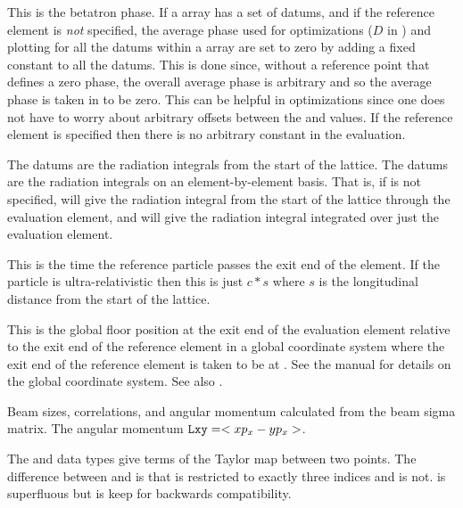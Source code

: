 \begin{description}
{  
  \item[phase.] \Newline
This is the betatron phase.  If a  array has a set of
 datums, and if the reference element is {\em not}
specified, the average phase used for optimizations ($D$ in
) and plotting for all the datums within a 
array are set to zero by adding a fixed constant to all the datums.
This is done since, without a reference point that defines a zero
phase, the overall average phase is arbitrary and so the average phase
is taken in \tao to be zero. This can be helpful in optimizations
since one does not have to worry about arbitrary offsets between the
 and  values. If the reference element is
specified then there is no arbitrary constant in the evaluation.

  \item[rad_int, rad_int1] \Newline
The  datums are the radiation integrals from the start of
the lattice. The  datums are the radiation integrals on
an element-by-element basis. That is, if  is not specified,
 will give the radiation integral from the start of the 
lattice through the evaluation element, and  will give
the radiation integral integrated over just the evaluation element.

  \item[ref_time] \Newline
This is the time the reference particle passes the exit end of the element.
If the particle is ultra-relativistic then this is just $c * s$ where $s$
is the longitudinal distance from the start of the lattice.

  \item[rel\_floor.] \Newline
This is the global floor position at the exit end of the evaluation
element relative to the exit end of the reference element in a global
coordinate system where the exit end of the reference element is taken to be at
. See the \bmad manual for details on
the global coordinate system. See also .

  \item[sigma.] \Newline
  Beam sizes, correlations, and angular momentum calculated from the
  beam sigma matrix. The angular momentum $\vn{Lxy} = <xp_x - yp_x>$. 

  \item[t. tt.] \Newline
The  and  data types give terms of the Taylor map between
two points. The difference between  and  is that
 is restricted to exactly three indices and  is
not.  is superfluous but is keep for backwards compatibility.

}
\end{description}
